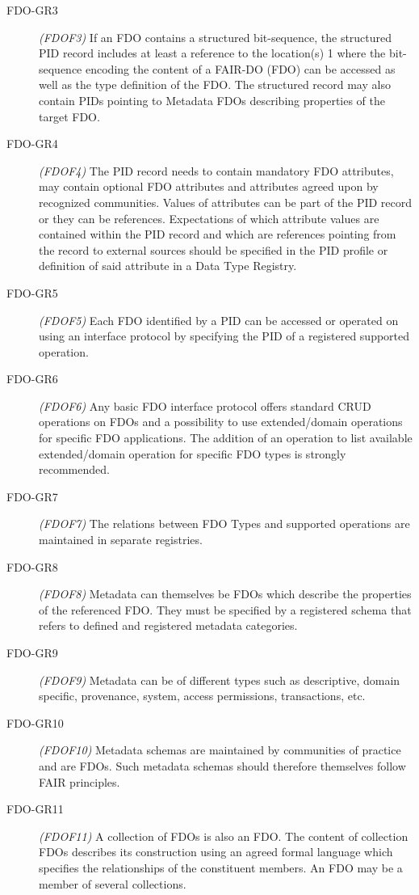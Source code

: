 \begin{description}
\item[FDO-GR3] \emph{(FDOF3)} If an FDO contains a structured bit-sequence, the structured PID record includes at least a reference to the location(s) 1 where the bit-sequence encoding the content of a FAIR-DO (FDO) can be accessed as well as the type definition of the FDO.  The structured record may also contain PIDs pointing to Metadata FDOs describing properties of the target FDO. 
\item[FDO-GR4] \emph{(FDOF4)} The PID record needs to contain mandatory FDO attributes, may contain optional FDO attributes and attributes agreed upon by recognized communities.  Values of attributes can be part of the PID record or they can be references.  Expectations of which attribute values are contained within the PID record and which are references pointing from the record to external sources should be specified in the PID profile or definition of said attribute in a Data Type Registry. 
\item[FDO-GR5] \emph{(FDOF5)} Each FDO identified by a PID can be accessed or operated on using an interface protocol by specifying the PID of a registered supported operation. 
\item[FDO-GR6] \emph{(FDOF6)} Any basic FDO interface protocol offers standard 
\acrfull{CRUD}
operations on FDOs and a possibility to use extended/domain operations for specific FDO applications.  The addition of an operation to list available extended/domain operation for specific FDO types is strongly recommended. 
\item[FDO-GR7] \emph{(FDOF7)} The relations between FDO Types and supported operations are maintained in separate registries. 
\item[FDO-GR8] \emph{(FDOF8)} Metadata can themselves be FDOs which describe the properties of the referenced FDO.  They must be specified by a registered schema that refers to defined and registered metadata categories. 
\item[FDO-GR9] \emph{(FDOF9)} Metadata can be of different types such as descriptive, domain specific, provenance, system, access permissions, transactions, etc. 
\item[FDO-GR10] \emph{(FDOF10)} Metadata schemas are maintained by communities of practice and are FDOs.  Such metadata schemas should therefore themselves follow FAIR principles. 
\item[FDO-GR11] \emph{(FDOF11)} A collection of FDOs is also an FDO.  The content of collection FDOs describes its construction using an agreed formal language which specifies the relationships of the constituent members.  An FDO may be a member of several collections. 

\end{description}
